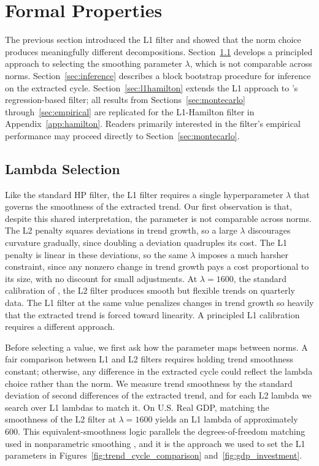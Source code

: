 \documentclass[10pt]{article}
\begin{document}
\section{Formal Properties}
\label{sec:formal}

The previous section introduced the L1 filter and showed that the norm choice produces meaningfully different decompositions. Section~\ref{sec:lambda} develops a principled approach to selecting the smoothing parameter $\lambda$, which is not comparable across norms. Section~\ref{sec:inference} describes a block bootstrap procedure for inference on the extracted cycle. Section~\ref{sec:l1hamilton} extends the L1 approach to \citet{hamilton2018}'s regression-based filter; all results from Sections~\ref{sec:montecarlo} through~\ref{sec:empirical} are replicated for the L1-Hamilton filter in Appendix~\ref{app:hamilton}. Readers primarily interested in the filter's empirical performance may proceed directly to Section~\ref{sec:montecarlo}.

\subsection{Lambda Selection}
\label{sec:lambda}

Like the standard HP filter, the L1 filter requires a single hyperparameter $\lambda$ that governs the smoothness of the extracted trend. Our first observation is that, despite this shared interpretation, the parameter is not comparable across norms. The L2 penalty squares deviations in trend growth, so a large $\lambda$ discourages curvature gradually, since doubling a deviation quadruples its cost. The L1 penalty is linear in these deviations, so the same $\lambda$ imposes a much harsher constraint, since any nonzero change in trend growth pays a cost proportional to its size, with no discount for small adjustments. At $\lambda = 1600$, the standard calibration of \citet{ravn_uhlig2002}, the L2 filter produces smooth but flexible trends on quarterly data. The L1 filter at the same value penalizes changes in trend growth so heavily that the extracted trend is forced toward linearity. A principled L1 calibration requires a different approach.

Before selecting a value, we first ask how the parameter maps between norms. A fair comparison between L1 and L2 filters requires holding trend smoothness constant; otherwise, any difference in the extracted cycle could reflect the lambda choice rather than the norm. We measure trend smoothness by the standard deviation of second differences of the extracted trend, and for each L2 lambda we search over L1 lambdas to match it. On U.S. Real GDP, matching the smoothness of the L2 filter at $\lambda = 1600$ yields an L1 lambda of approximately 600. This equivalent-smoothness logic parallels the degrees-of-freedom matching used in nonparametric smoothing \citep{hastie_tibshirani1990}, and it is the approach we used to set the L1 parameters in Figures~\ref{fig:trend_cycle_comparison} and~\ref{fig:gdp_investment}.
\end{document}
